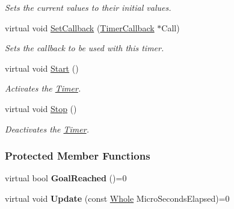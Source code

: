 \begin{DoxyCompactItemize}
\begin{DoxyCompactList}\small\item\em Sets the current values to their initial values. \item\end{DoxyCompactList}\item 
virtual void \hyperlink{classMezzanine_1_1Timer_a065f49422924ce93dcc2e25b2e059e3b}{SetCallback} (\hyperlink{classMezzanine_1_1TimerCallback}{TimerCallback} $\ast$Call)
\begin{DoxyCompactList}\small\item\em Sets the callback to be used with this timer. \item\end{DoxyCompactList}\item 
\hypertarget{classMezzanine_1_1Timer_a971737d83ba98db13b7cabb4213cbca5}{
virtual void \hyperlink{classMezzanine_1_1Timer_a971737d83ba98db13b7cabb4213cbca5}{Start} ()}
\label{classMezzanine_1_1Timer_a971737d83ba98db13b7cabb4213cbca5}

\begin{DoxyCompactList}\small\item\em Activates the \hyperlink{classMezzanine_1_1Timer}{Timer}. \item\end{DoxyCompactList}\item 
\hypertarget{classMezzanine_1_1Timer_ac128fca1ea52a5b91295d1dff838074c}{
virtual void \hyperlink{classMezzanine_1_1Timer_ac128fca1ea52a5b91295d1dff838074c}{Stop} ()}
\label{classMezzanine_1_1Timer_ac128fca1ea52a5b91295d1dff838074c}

\begin{DoxyCompactList}\small\item\em Deactivates the \hyperlink{classMezzanine_1_1Timer}{Timer}. \item\end{DoxyCompactList}\end{DoxyCompactItemize}
\subsubsection*{Protected Member Functions}
\begin{DoxyCompactItemize}
\item 
\hypertarget{classMezzanine_1_1Timer_abcd1de5126273b78f34e06b9d9ad76d8}{
virtual bool {\bfseries GoalReached} ()=0}
\label{classMezzanine_1_1Timer_abcd1de5126273b78f34e06b9d9ad76d8}

\item 
\hypertarget{classMezzanine_1_1Timer_af30e1b84d6559c1b381fc9c9b2e05d3b}{
virtual void {\bfseries Update} (const \hyperlink{namespaceMezzanine_adcbb6ce6d1eb4379d109e51171e2e493}{Whole} MicroSecondsElapsed)=0}
\label{classMezzanine_1_1Timer_af30e1b84d6559c1b381fc9c9b2e05d3b}

\end{DoxyCompactItemize}
